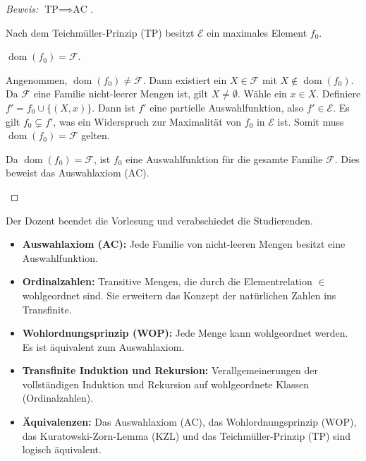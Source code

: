 \begin{proof}[Beweis: $\text{TP} \implies \text{AC}$]
\begin{math-stroke}
Nach dem Teichmüller-Prinzip ($\text{TP}$) besitzt $\mathcal{E}$ ein maximales Element $f_0$.

\begin{claim}
$\operatorname{dom}(f_0) = \mathcal{F}$.
\end{claim}
\begin{short-proof}
Angenommen, $\operatorname{dom}(f_0) \neq \mathcal{F}$. Dann existiert ein $X \in \mathcal{F}$ mit $X \notin \operatorname{dom}(f_0)$.
Da $\mathcal{F}$ eine Familie nicht-leerer Mengen ist, gilt $X \neq \emptyset$.
Wähle ein $x \in X$.
Definiere $f' = f_0 \cup \{(X, x)\}$.
Dann ist $f'$ eine partielle Auswahlfunktion, also $f' \in \mathcal{E}$.
Es gilt $f_0 \subsetneq f'$, was ein Widerspruch zur Maximalität von $f_0$ in $\mathcal{E}$ ist.
Somit muss $\operatorname{dom}(f_0) = \mathcal{F}$ gelten.
\end{short-proof}

Da $\operatorname{dom}(f_0) = \mathcal{F}$, ist $f_0$ eine Auswahlfunktion für die gesamte Familie $\mathcal{F}$.
Dies beweist das Auswahlaxiom ($\text{AC}$).
\end{math-stroke}
\end{proof}

\begin{meta-note}
Der Dozent beendet die Vorlesung und verabschiedet die Studierenden.
\end{meta-note}

\begin{spoken-clean}[01:10:00 - 01:29:21]
\end{spoken-clean}

\begin{nice-box}
\begin{itemize}
    \item \textbf{Auswahlaxiom (AC):} Jede Familie von nicht-leeren Mengen besitzt eine Auswahlfunktion.
    \item \textbf{Ordinalzahlen:} Transitive Mengen, die durch die Elementrelation $\in$ wohlgeordnet sind. Sie erweitern das Konzept der natürlichen Zahlen ins Transfinite.
    \item \textbf{Wohlordnungsprinzip (WOP):} Jede Menge kann wohlgeordnet werden. Es ist äquivalent zum Auswahlaxiom.
    \item \textbf{Transfinite Induktion und Rekursion:} Verallgemeinerungen der vollständigen Induktion und Rekursion auf wohlgeordnete Klassen (Ordinalzahlen).
    \item \textbf{Äquivalenzen:} Das Auswahlaxiom ($\text{AC}$), das Wohlordnungsprinzip ($\text{WOP}$), das Kuratowski-Zorn-Lemma ($\text{KZL}$) und das Teichmüller-Prinzip ($\text{TP}$) sind logisch äquivalent.
\end{itemize}
\end{nice-box}